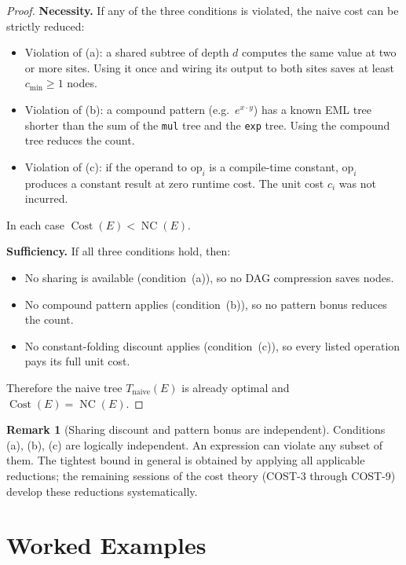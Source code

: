 \documentclass[12pt,a4paper]{article}
\theoremstyle{definition}
\newtheorem{remark}[theorem]{Remark}
\newcommand{\NC}{\operatorname{NC}}
\newcommand{\Cost}{\operatorname{Cost}}
\begin{document}
\begin{proof}
\noindent\textbf{Necessity.}
If any of the three conditions is violated, the naive cost can be strictly
reduced:
\begin{itemize}
  \item Violation of (a): a shared subtree of depth $d$ computes the same
        value at two or more sites.  Using it once and wiring its output to
        both sites saves at least $c_{\min} \geq 1$ nodes.
  \item Violation of (b): a compound pattern (e.g.\ $e^{x \cdot y}$) has
        a known EML tree shorter than the sum of the \texttt{mul} tree and
        the \texttt{exp} tree.  Using the compound tree reduces the count.
  \item Violation of (c): if the operand to $\mathrm{op}_i$ is a compile-time
        constant, $\mathrm{op}_i$ produces a constant result at zero runtime
        cost.  The unit cost $c_i$ was not incurred.
\end{itemize}
In each case $\Cost(E) < \NC(E)$.

\noindent\textbf{Sufficiency.}
If all three conditions hold, then:
\begin{itemize}
  \item No sharing is available (condition~(a)), so no DAG compression saves nodes.
  \item No compound pattern applies (condition~(b)), so no pattern bonus reduces the count.
  \item No constant-folding discount applies (condition~(c)), so every listed
        operation pays its full unit cost.
\end{itemize}
Therefore the naive tree $T_{\mathrm{naive}}(E)$ is already optimal and
$\Cost(E) = \NC(E)$.
\end{proof}

\begin{remark}[Sharing discount and pattern bonus are independent]
Conditions (a), (b), (c) are logically independent.
An expression can violate any subset of them.
The tightest bound in general is obtained by applying all applicable
reductions; the remaining sessions of the cost theory (COST-3 through COST-9)
develop these reductions systematically.
\end{remark}

\section{Worked Examples}
\label{sec:examples}
\end{document}
